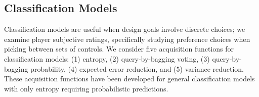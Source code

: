 \documentclass{sig-alternate}
\begin{document}




\subsection{Classification Models}
Classification models are useful when design goals involve discrete choices; we examine player subjective ratings, specifically studying preference choices when picking between sets of controls.
We consider five acquisition functions for classification models: (1) entropy, (2) query-by-bagging voting, (3) query-by-bagging probability, (4) expected error reduction, and (5) variance reduction.
These acquisition functions have been developed for general classification models with only entropy requiring probabilistic predictions.
\end{document}

